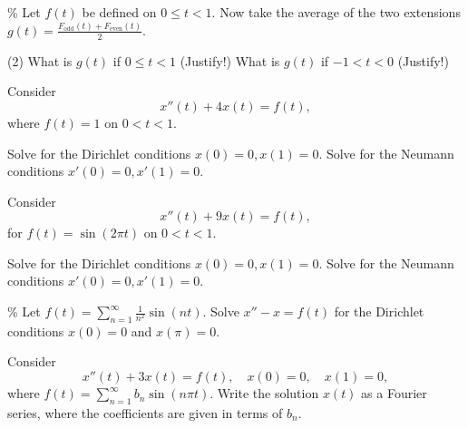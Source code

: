 \documentclass{ximera}
\begin{document}
\begin{exercise}\%
    Let $f(t)$ be defined on $0 \leq t < 1$.  Now take the average of the two extensions $g(t) = \frac{F_{\text{odd}}(t)+ F_{\text{even}}(t)}{2}$.
    \begin{tasks}(2)
        \task What is $g(t)$ if $0 \leq t < 1$ (Justify!)
        \task What is $g(t)$ if $-1 < t < 0$ (Justify!)
    \end{tasks}
\end{exercise}


\begin{exercise}
    Consider
    \begin{equation*}
        x''(t) + 4 x(t) = f(t) ,
    \end{equation*}
    where $f(t) = 1$ on $0 < t < 1$.
    \begin{tasks}
        \task Solve for the Dirichlet conditions $x(0)=0, x(1) = 0$.
        \task Solve for the Neumann conditions $x'(0)=0, x'(1) = 0$.
    \end{tasks}
\end{exercise}

\begin{exercise}
    Consider
    \begin{equation*}
        x''(t) + 9 x(t) = f(t) ,
    \end{equation*}
    for $f(t) = \sin (2\pi t)$ on $0 < t < 1$.
    \begin{tasks}
        \task Solve for the Dirichlet conditions $x(0)=0, x(1) = 0$.
        \task Solve for the Neumann conditions $x'(0)=0, x'(1) = 0$.
    \end{tasks}
\end{exercise}

\begin{exercise}\%
    Let $f(t) = \sum_{n=1}^\infty \frac{1}{n^2} \sin(nt)$.  Solve $x''- x = f(t)$ for the Dirichlet conditions $x(0) = 0$ and $x(\pi) = 0$.
\end{exercise}

\begin{exercise}
    Consider
    \begin{equation*}
        x''(t) + 3 x(t) = f(t) , \quad x(0) = 0, \quad x(1) = 0,
    \end{equation*}
    where $f(t) = \sum_{n=1}^\infty b_n \sin (n \pi t)$.  Write the solution $x(t)$ as a Fourier series, where the coefficients are given in terms of $b_n$.
\end{exercise}
\end{document}

